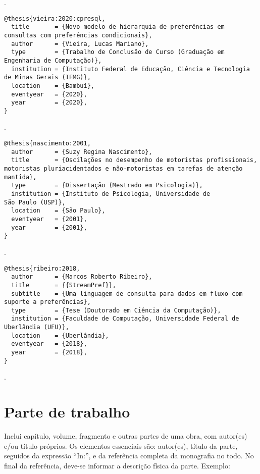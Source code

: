 \noindent
{}.

\vspace*{1em}

\begin{verbatim}
@thesis{vieira:2020:cpresql,
  title       = {Novo modelo de hierarquia de preferências em consultas com preferências condicionais},
  author      = {Vieira, Lucas Mariano},
  type        = {Trabalho de Conclusão de Curso (Graduação em Engenharia de Computação)},
  institution = {Instituto Federal de Educação, Ciência e Tecnologia de Minas Gerais (IFMG)},
  location    = {Bambuí},
  eventyear   = {2020},
  year        = {2020},
}
\end{verbatim}

\noindent
{}.

\vspace*{1em}

\begin{verbatim}
@thesis{nascimento:2001,
  author      = {Suzy Regina Nascimento},
  title       = {Oscilações no desempenho de motoristas profissionais, motoristas pluriacidentados e não-motoristas em tarefas de atenção mantida},
  type        = {Dissertação (Mestrado em Psicologia)},
  institution = {Instituto de Psicologia, Universidade de
São Paulo (USP)},
  location    = {São Paulo},
  eventyear   = {2001},
  year        = {2001},
}
\end{verbatim}

\noindent
{}.

\vspace*{1em}

\begin{verbatim}
@thesis{ribeiro:2018,
  author      = {Marcos Roberto Ribeiro},
  title       = {{StreamPref}},
  subtitle    = {Uma linguagem de consulta para dados em fluxo com suporte a preferências},
  type        = {Tese (Doutorado em Ciência da Computação)},
  institution = {Faculdade de Computação, Universidade Federal de Uberlândia (UFU)},
  location    = {Uberlândia},
  eventyear   = {2018},
  year        = {2018},
}
\end{verbatim}

\noindent
{}.

\section{Parte de trabalho}

Inclui capítulo, volume, fragmento e outras partes de uma obra, com autor(es) e/ou título próprios.
Os elementos essenciais são: autor(es), título da parte, seguidos da expressão ``In:'', e da referência completa da monografia no todo. No final da referência, deve-se informar a descrição física da parte.
Exemplo:

